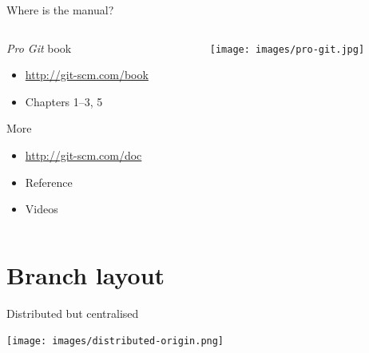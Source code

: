 \documentclass{beamer}
\begin{document}
\begin{frame}{Where is the manual?}
  \begin{columns}
    \begin{column}[t]{6cm}
      \begin{block}{\emph{Pro Git} book}
        \begin{itemize}
        \item \url{http://git-scm.com/book}
        \item Chapters 1--3, 5
        \end{itemize}
      \end{block}
      \begin{block}{More}
        \begin{itemize}
        \item \url{http://git-scm.com/doc}
        \item Reference
        \item Videos
        \end{itemize}
      \end{block}
    \end{column}
    \begin{column}[t]{3cm}
      \begin{center}
        \texttt{[image: images/pro-git.jpg]}
      \end{center}
    \end{column}
  \end{columns}
\end{frame}

\section{Branch layout}
\begin{frame}{Distributed but centralised}
  \begin{center}
    \texttt{[image: images/distributed-origin.png]}
  \end{center}
\end{frame}

\end{document}
